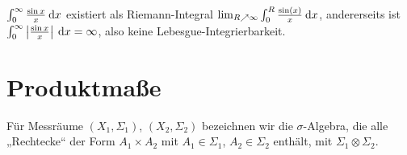 \documentclass[skript.tex]{subfiles}
\begin{document}
	\begin{bsp*}
		$\int_0^\infty \frac{\sin x}{x} \: \mathrm{d} x$ existiert als Riemann-Integral
		$\lim_{R\nearrow\infty} \int_0^R \frac{\sin(x)}{x} \: \mathrm{d} x$, andererseits ist \\
		$\int_0^\infty\left|\frac{\sin x}{x}\right| \: \mathrm{d} x = \infty$, also keine
		Lebesgue-Integrierbarkeit.
	\end{bsp*}

	\section{Produktmaße}
	\begin{notat}
		Für Messräume $(X_1,\Sigma_1)$, $(X_2,\Sigma_2)$ bezeichnen wir die
		$\sigma$-Algebra, die alle „Rechtecke“ der Form $A_1 \times A_2$ mit 
		$A_1 \in \Sigma_1$, $A_2 \in \Sigma_2$ enthält, mit $\Sigma_1 \otimes \Sigma_2$.
	\end{notat}
\end{document}
